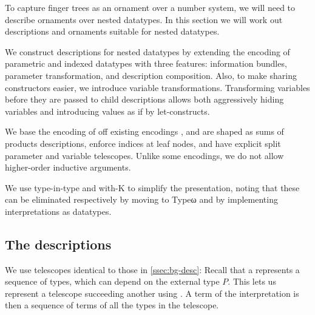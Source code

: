 To capture finger trees as an ornament over a number system, we will need to describe ornaments over nested datatypes. In this section we will work out descriptions and ornaments suitable for nested datatypes.

We construct descriptions for nested datatypes by extending the encoding of parametric and indexed datatypes with three features: information bundles, parameter transformation, and description composition. Also, to make sharing constructors easier, we introduce variable transformations. Transforming variables before they are passed to child descriptions allows both aggressively hiding variables and introducing values as if by let-constructs.

We base the encoding of off existing encodings \cite{sijsling,practgen}, and are shaped as sums of products descriptions, enforce indices at leaf nodes, and have explicit split parameter and variable telescopes. Unlike some encodings, we do not allow higher-order inductive arguments. 

We use type-in-type and with-K to simplify the presentation, noting that these can be eliminated respectively by moving to Typeω and by implementing interpretations as datatypes.

\subsection{The descriptions}\label{ssec:desc}
We use telescopes identical to those in \autoref{ssec:bg-desc}:
Recall that a  represents a sequence of types, which can depend on the external type $P$. This lets us represent a telescope succeeding another using . A term of the interpretation  is then a sequence of terms of all the types in the telescope.

